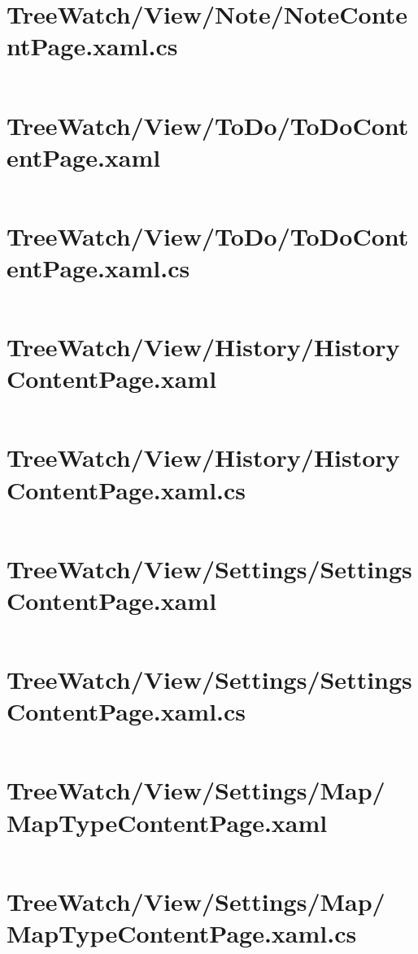 \documentclass[12pt]{article}
\begin{document}
\section{TreeWatch/View/Note/NoteContentPage.xaml.cs}
\inputminted[linenos,firstline=22]{csharp}{../../../src/TreeWatch/View/Note/NoteContentPage.xaml.cs}
\section{TreeWatch/View/ToDo/ToDoContentPage.xaml}
\inputminted[linenos]{xml}{../../../src/TreeWatch/View/ToDo/ToDoContentPage.xaml}
\section{TreeWatch/View/ToDo/ToDoContentPage.xaml.cs}
\inputminted[linenos,firstline=22]{csharp}{../../../src/TreeWatch/View/ToDo/ToDoContentPage.xaml.cs}
\section{TreeWatch/View/History/HistoryContentPage.xaml}
\inputminted[linenos]{xml}{../../../src/TreeWatch/View/History/HistoryContentPage.xaml}
\section{TreeWatch/View/History/HistoryContentPage.xaml.cs}
\inputminted[linenos,firstline=22]{csharp}{../../../src/TreeWatch/View/History/HistoryContentPage.xaml.cs}
\section{TreeWatch/View/Settings/SettingsContentPage.xaml}
\inputminted[linenos]{xml}{../../../src/TreeWatch/View/Settings/SettingsContentPage.xaml}
\section{TreeWatch/View/Settings/SettingsContentPage.xaml.cs}
\inputminted[linenos,firstline=22]{csharp}{../../../src/TreeWatch/View/Settings/SettingsContentPage.xaml.cs}
\section{TreeWatch/View/Settings/Map/ MapTypeContentPage.xaml}
\inputminted[linenos]{xml}{../../../src/TreeWatch/View/Settings/Map/MapTypeContentPage.xaml}
\section{TreeWatch/View/Settings/Map/ MapTypeContentPage.xaml.cs}
\inputminted[linenos,firstline=22]{csharp}{../../../src/TreeWatch/View/Settings/Map/MapTypeContentPage.xaml.cs}
\end{document}
